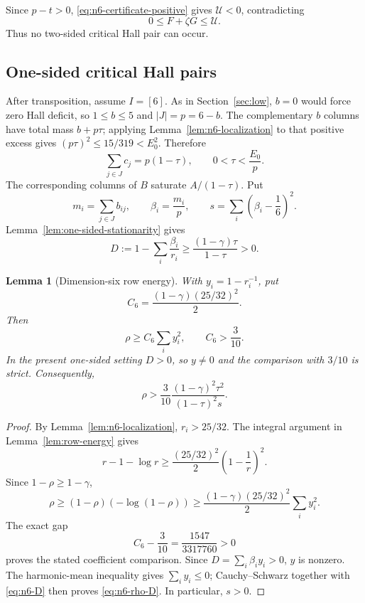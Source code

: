 \documentclass[11pt,a4paper]{article}
\numberwithin{equation}{section}
\newtheorem{lemma}[theorem]{Lemma}
\theoremstyle{definition}
\newcommand{\1}{\mathbf{1}}
\begin{document}
Since $p-t>0$, \eqref{eq:n6-certificate-positive} gives $\mathcal U<0$,
contradicting
\[
 0\le F+\zeta G\le\mathcal U.
\]
Thus no two-sided critical Hall pair can occur.

\subsection{One-sided critical Hall pairs}

After transposition, assume $I=[6]$.  As in Section~\ref{sec:low},
$b=0$ would force zero Hall deficit, so $1\le b\le5$ and
$|J|=p=6-b$.  The complementary $b$ columns have total mass $b+p\tau$;
applying Lemma~\ref{lem:n6-localization} to that positive excess gives
$(p\tau)^2\le15/319<E_0^2$.  Therefore
\begin{equation}\label{eq:n6-one-sided-mass}
 \sum_{j\in J}c_j=p(1-\tau),
 \qquad
 0<\tau<\frac{E_0}{p}.
\end{equation}
The corresponding columns of $B$ saturate $A/(1-\tau)$.  Put
\[
 m_i=\sum_{j\in J}b_{ij},
 \qquad
 \beta_i=\frac{m_i}{p},
 \qquad
 s=\sum_i\left(\beta_i-\frac16\right)^2.
\]
Lemma~\ref{lem:one-sided-stationarity} gives
\begin{equation}\label{eq:n6-D}
 D:=1-\sum_i\frac{\beta_i}{r_i}
 \ge\frac{(1-\gamma)\tau}{1-\tau}>0.
\end{equation}

\begin{lemma}[Dimension-six row energy]\label{lem:n6-row-energy}
With $y_i=1-r_i^{-1}$, put
\[
 C_6=\frac{(1-\gamma)(25/32)^2}{2}.
\]
Then
\begin{equation}\label{eq:n6-row-energy}
 \rho\ge C_6\sum_i y_i^2,
 \qquad C_6>\frac3{10}.
\end{equation}
In the present one-sided setting $D>0$, so $y\ne0$ and the comparison with
$3/10$ is strict.  Consequently,
\begin{equation}\label{eq:n6-rho-D}
 \rho>\frac3{10}
 \frac{(1-\gamma)^2\tau^2}{(1-\tau)^2s}.
\end{equation}
\end{lemma}

\begin{proof}
By Lemma~\ref{lem:n6-localization}, $r_i>25/32$.  The integral argument in
Lemma~\ref{lem:row-energy} gives
\[
 r-1-\log r\ge\frac{(25/32)^2}{2}
 \left(1-\frac1r\right)^2.
\]
Since $1-\rho\ge1-\gamma$,
\[
 \rho\ge(1-\rho)(-\log(1-\rho))
 \ge\frac{(1-\gamma)(25/32)^2}{2}\sum_i y_i^2.
\]
The exact gap
\begin{equation}\label{eq:n6-energy-gap}
 C_6-\frac3{10}
 =\frac{1547}{3317760}>0
\end{equation}
proves the stated coefficient comparison.  Since $D=\sum_i\beta_i y_i>0$,
$y$ is nonzero.  The harmonic-mean inequality gives $\sum_i y_i\le0$;
Cauchy--Schwarz together with \eqref{eq:n6-D} then proves
\eqref{eq:n6-rho-D}.  In particular, $s>0$.
\end{proof}
\end{document}
